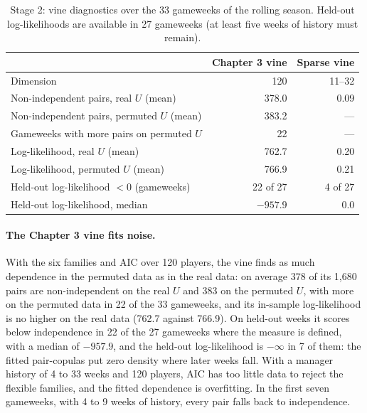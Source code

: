 \begin{table}[ht]
  \centering
  \caption{Stage 2: vine diagnostics over the 33 gameweeks of the rolling season. Held-out
  log-likelihoods are available in 27 gameweeks (at least five weeks of history must remain).}
  \label{tab:s2-vine}
  \begin{tabular}{lrr}
    \toprule
    & Chapter 3 vine & Sparse vine \\
    \midrule
    Dimension                                   & 120 & 11--32 \\
    Non-independent pairs, real $U$ (mean)      & 378.0 & 0.09 \\
    Non-independent pairs, permuted $U$ (mean)  & 383.2 & --- \\
    Gameweeks with more pairs on permuted $U$   & 22 & --- \\
    Log-likelihood, real $U$ (mean)             & 762.7 & 0.20 \\
    Log-likelihood, permuted $U$ (mean)         & 766.9 & 0.21 \\
    Held-out log-likelihood $<0$ (gameweeks)    & 22 of 27 & 4 of 27 \\
    Held-out log-likelihood, median             & $-957.9$ & 0.0 \\
    \bottomrule
  \end{tabular}
\end{table}

\paragraph{The Chapter 3 vine fits noise.} With the six families and AIC over 120 players, the
vine finds as much dependence in the permuted data as in the real data: on average 378 of its
1{,}680 pairs are non-independent on the real $U$ and 383 on the permuted $U$, with more on the
permuted data in 22 of the 33 gameweeks, and its in-sample log-likelihood is no higher on the
real data (762.7 against 766.9). On held-out weeks it scores below independence in 22 of the 27
gameweeks where the measure is defined, with a median of $-957.9$, and the held-out
log-likelihood is $-\infty$ in 7 of them: the fitted pair-copulas put zero density where later
weeks fall. With a manager history of 4 to 33 weeks and 120 players, AIC has too little data to
reject the flexible families, and the fitted dependence is overfitting. In the first seven
gameweeks, with 4 to 9 weeks of history, every pair falls back to independence.

